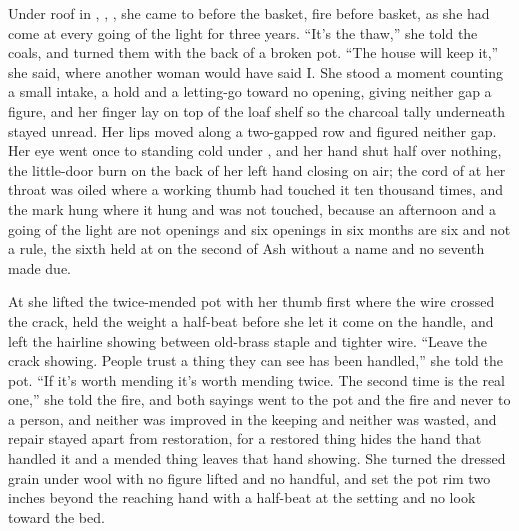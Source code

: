 Under  roof in , , , she came to  before the basket, fire before basket, as she had come at every going of the light for three years. “It's the thaw,” she told the coals, and turned them with the back of a broken pot. “The house will keep it,” she said, where another woman would have said I. She stood a moment counting a small intake, a hold and a letting-go toward no opening, giving neither gap a figure, and her finger lay on top of the loaf shelf so the charcoal tally underneath stayed unread. Her lips moved along a two-gapped row and figured neither gap. Her eye went once to  standing cold under , and her hand shut half over nothing, the little-door burn on the back of her left hand closing on air; the cord of  at her throat was oiled where a working thumb had touched it ten thousand times, and the mark hung where it hung and was not touched, because an afternoon and a going of the light are not openings and six openings in six months are six and not a rule, the sixth held at  on the second of Ash without a name and no seventh made due.

At  she lifted the twice-mended pot with her thumb first where the wire crossed the crack, held the weight a half-beat before she let it come on the handle, and left the hairline showing between old-brass staple and tighter wire. “Leave the crack showing. People trust a thing they can see has been handled,” she told the pot. “If it's worth mending it's worth mending twice. The second time is the real one,” she told the fire, and both sayings went to the pot and the fire and never to a person, and neither was improved in the keeping and neither was wasted, and repair stayed apart from restoration, for a restored thing hides the hand that handled it and a mended thing leaves that hand showing. She turned the dressed grain under wool with no figure lifted and no handful, and set the pot rim two inches beyond the reaching hand with a half-beat at the setting and no look toward the bed.

